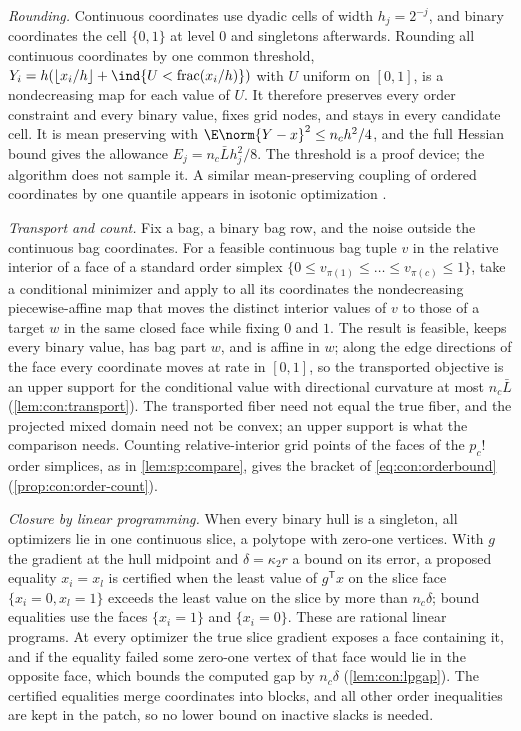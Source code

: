 \emph{Rounding.} Continuous coordinates use dyadic cells of width
$h_j=2^{-j}$, and binary coordinates the cell $\{0,1\}$ at level $0$ and
singletons afterwards. Rounding all continuous coordinates by one common
threshold, $Y_i=h(\lfloor x_i/h\rfloor+\ind\{U<\operatorname{frac}(x_i/h)\})$
with $U$ uniform on $[0,1]$, is a nondecreasing map for each value of $U$.
It therefore preserves every order constraint and every binary value, fixes
grid nodes, and stays in every candidate cell. It is mean preserving with
$\E\norm{Y-x}^2\le n_ch^2/4$, and the full Hessian bound gives the allowance
$E_j=n_c\bar Lh_j^2/8$. The threshold is a proof device; the algorithm does
not sample it. A similar mean-preserving coupling of ordered coordinates by
one quantile appears in isotonic optimization \citep{bach2018-efficient-algorithms-for-non-convex}.

\emph{Transport and count.} Fix a bag, a binary bag row, and the noise
outside the continuous bag coordinates. For a feasible continuous bag tuple
$v$ in the relative interior of a face of a standard order simplex
$\{0\le v_{\pi(1)}\le\dots\le v_{\pi(c)}\le1\}$, take a conditional minimizer
and apply to all its coordinates the nondecreasing piecewise-affine map that
moves the distinct interior values of $v$ to those of a target $w$ in the
same closed face while fixing $0$ and $1$. The result is feasible, keeps every
binary value, has bag part $w$, and is affine in $w$; along the edge
directions of the face every coordinate moves at rate in $[0,1]$, so the
transported objective is an upper support for the conditional value with
directional curvature at most $n_c\bar L$ (\cref{lem:con:transport}). The
transported fiber need not equal the true fiber, and the projected mixed
domain need not be convex; an upper support is what the comparison needs.
Counting relative-interior grid points of the faces of the $p_c!$ order
simplices, as in \cref{lem:sp:compare}, gives the bracket of
\eqref{eq:con:orderbound} (\cref{prop:con:order-count}).

\emph{Closure by linear programming.} When every binary hull is a singleton,
all optimizers lie in one continuous slice, a polytope with zero-one
vertices. With $g$ the gradient at the hull midpoint and $\delta=\kappa_2r$
a bound on its error, a proposed equality $x_i=x_l$ is certified when the
least value of $g^{\mathsf T}x$ on the slice face $\{x_i=0,x_l=1\}$ exceeds
the least value on the slice by more than $n_c\delta$; bound equalities use the
faces $\{x_i=1\}$ and $\{x_i=0\}$. These are rational linear programs. At
every optimizer the true slice gradient exposes a face containing it, and if
the equality failed some zero-one vertex of that face would lie in the
opposite face, which bounds the computed gap by $n_c\delta$
(\cref{lem:con:lpgap}). The certified equalities merge coordinates into
blocks, and all other order inequalities are kept in the patch, so no lower
bound on inactive slacks is needed.

